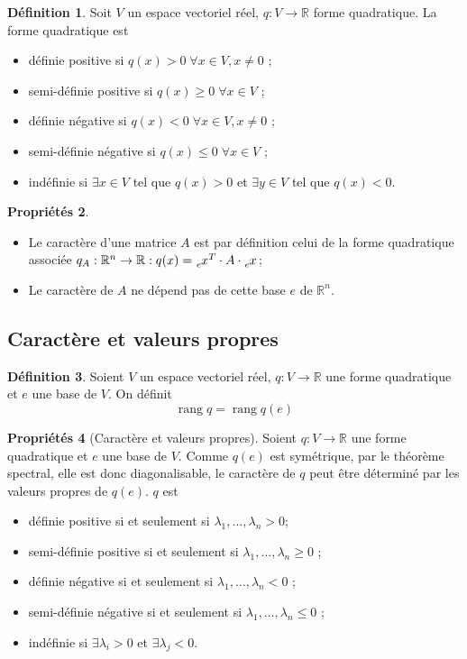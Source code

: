 \documentclass[11pt,a4paper]{article}
\theoremstyle{definition}
\newtheorem{mydef}{Définition}%
\newtheorem{myprop}[mydef]{Propriétés}
\DeclareMathOperator{\newrang}{rang}
\newcommand{\R}{\mathbb{R}}
\newcommand{\Rn}{\R^n}
\newcommand*\InsertTheoremBreak{%
	\begingroup %
		\setlength\itemsep{0pt}%
		\setlength\parsep{0pt}%
		\item[\vbox{\null}]%
	\endgroup%
}%
\begin{document}
\begin{mydef}
	Soit $V$ un espace vectoriel réel, $q : V \rightarrow \R$ forme quadratique. La forme quadratique est
	\begin{itemize}
		\item définie positive si $q(x) >0 \; \forall x \in V, x \neq 0$ ;
		\item semi-définie positive si $q(x) \geq 0 \; \forall x \in V$ ;
		\item définie négative si $q(x) < 0 \; \forall x \in V, x \neq 0$ ;
		\item semi-définie négative si $q(x) \leq 0 \; \forall x \in V$ ;
		\item indéfinie si $\exists x \in V$ tel que $q(x) > 0$ et $\exists y \in V$ tel que $q(x) < 0$.
	\end{itemize}
\end{mydef}

\begin{myprop}
	\InsertTheoremBreak
	\begin{itemize}
		\item Le caractère d'une matrice $A$ est par définition celui de la forme quadratique associée
			$q_A: \Rn \to \R: q(x) = \tensor[_e]{x}{^T} \cdot A \cdot \tensor[_e]{x}{}$;
		\item Le caractère de $A$ ne dépend pas de cette base $e$ de $\R^n$.
	\end{itemize}
\end{myprop}

\subsection{Caractère et valeurs propres}

\begin{mydef}
	Soient $V$ un espace vectoriel réel, $q : V \rightarrow \R$ une forme quadratique et $e$ une base de $V$.
	On définit
	\[ \newrang q = \newrang q(e) \]
\end{mydef}

\begin{myprop}[Caractère et valeurs propres]
	Soient $q: V \to \R$ une forme quadratique et $e$ une base de $V$.
	Comme $q(e)$ est symétrique, par le théorème spectral, elle est donc diagonalisable,
	le caractère de $q$ peut être déterminé par les valeurs propres de $q(e)$. $q$ est
	\begin{itemize}
		\item définie positive si et seulement si $\lambda_1, \dots, \lambda_n > 0$;
		\item semi-définie positive si et seulement si $\lambda_1, \dots, \lambda_n \geq 0$ ;
		\item définie négative si et seulement si $\lambda_1, \dots, \lambda_n < 0$ ;
		\item semi-définie négative si et seulement si $\lambda_1, \dots, \lambda_n \leq 0$ ;
		\item indéfinie si $\exists  \lambda_i > 0$ et $\exists \lambda_j < 0$.
	\end{itemize}
\end{myprop}
\end{document}
